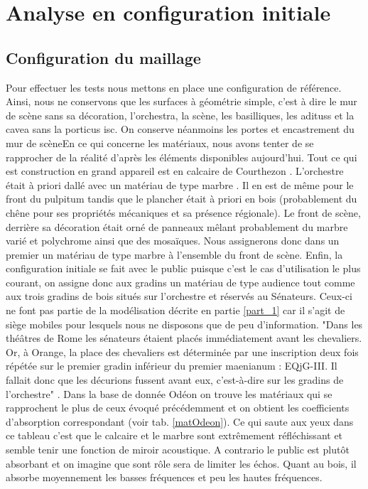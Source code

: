 	
\chapter{Analyse en configuration initiale}
	\minitoc
	\newpage
	

	\section{Configuration du maillage}
Pour effectuer les tests nous mettons en place une configuration de référence.	Ainsi, nous ne conservons que les surfaces à géométrie simple, c'est à dire le mur de scène sans sa décoration, l'\gls{orchestra}, la scène, les basilliques, les \glspl{aditus} et la \gls{cavea} sans la \gls{porticus isc}. On conserve néanmoins les portes et encastrement du mur de scèneEn ce qui concerne les matériaux, nous avons tenter de se rapprocher de la réalité d'après les éléments disponibles aujourd'hui. Tout ce qui est construction en grand appareil est en calcaire de Courthezon \cite[p.43]{orangeTxt}. L'orchestre était à priori dallé avec un matériau de type marbre \cite[p.337]{orangeTxt}. Il en est de même pour le front du \gls{pulpitum} tandis que le plancher était à priori en bois (probablement du chêne pour ses propriétés mécaniques et sa présence régionale). Le front de scène, derrière sa décoration était orné de panneaux mêlant probablement du marbre varié et polychrome ainsi que des mosaïques. Nous assignerons donc dans un premier un matériau de type marbre à l'ensemble du front de scène. Enfin, la configuration initiale se fait avec le public puisque c'est le cas d'utilisation le plus courant, on assigne donc aux gradins un matériau de type audience tout comme aux trois gradins de bois situés sur l'orchestre et réservés au Sénateurs. Ceux-ci ne font pas partie de la modélisation décrite en partie \ref{part_1} car il s'agit de siège mobiles pour lesquels nous ne disposons que de peu d'information. "Dans les théâtres de Rome les sénateurs étaient placés immédiatement avant les chevaliers. Or, à Orange, la place des chevaliers est déterminée par une inscription deux fois répétée sur le premier gradin inférieur du premier \gls{maenianum} : EQjG-III. Il fallait donc que les décurions fussent avant eux, c'est-à-dire sur les gradins de l'orchestre" \cite[p.46]{formige}. Dans la base de donnée Odéon \cite[materials]{odeon} on trouve les matériaux qui se rapprochent le plus de ceux évoqué précédemment et on obtient les coefficients d'absorption correspondant (voir tab. \ref{matOdeon}). Ce qui saute aux yeux dans ce tableau c'est que le calcaire et le marbre sont extrêmement réfléchissant et semble tenir une fonction de miroir acoustique. A contrario le public est plutôt absorbant et on imagine que sont rôle sera de limiter les échos. Quant au bois, il absorbe moyennement les basses fréquences et peu les hautes fréquences.
